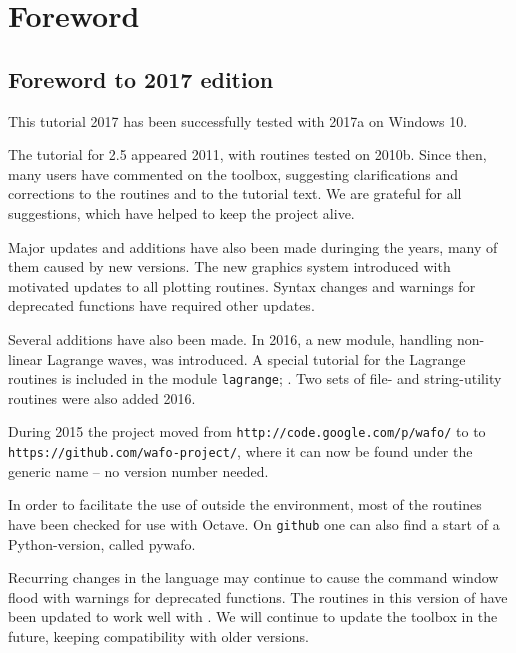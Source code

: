 %
\chapter{Foreword}
\section*{Foreword to 2017 edition}
\vspace{-0mm}
This \wf{} tutorial 2017 has been successfully tested with \ML{} 2017a on {\sc Windows} 10.

The tutorial for \wf{} 2.5 appeared 2011, with routines tested on \ML{} 2010b. 
Since then, many users have commented on the toolbox, suggesting clarifications 
and corrections to the routines and to the tutorial text.  We are grateful for all suggestions, 
which have helped to keep the \wf{} project alive. 

Major updates and additions have also been made duringing the years, 
many of them caused by new \ML{} versions. 
The new graphics system introduced with   
motivated updates to all plotting routines. Syntax changes and warnings for deprecated functions 
have required other updates. 

Several additions have also been made. In 2016, a new module, handling non-linear 
Lagrange waves, was introduced. 
A special tutorial for the Lagrange routines is included in the module {\tt lagrange}; \cite{LindgrenPrevosto2017}.  
Two sets of file- and string-utility routines were also added 2016. 

During 2015 the \wf{-}project moved from 
\verb+http://code.google.com/p/wafo/+ to
to 
\verb+https://github.com/wafo-project/+, where it can now be found under the generic 
name \wf{} -- no version number needed. 

In order to facilitate the use of  \wf{} outside the \ML{} environment, 
most of the \wf{} routines have been checked for use with {\sc Octave}. 
On {\tt github}  one can also find a start of a {\sc Python}-version, called {\sf pywafo}. 

Recurring changes in the \ML{} language may continue to cause the command 
window flood with 
warnings for deprecated functions. The routines in this version of \wf{} have 
been updated to work well with . We will continue to update the toolbox 
in the future, keeping compatibility with older versions.

